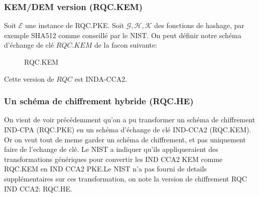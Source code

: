 \documentclass[12pt]{article}
\begin{document}
\subsubsection{KEM/DEM version (RQC.KEM)}
Soit $\mathcal{E}$ une instance de RQC.PKE. Soit $\mathcal{G}, \mathcal{H}, \mathcal{K}$ des fonctions de hashage, par exemple SHA512 comme conseillé par le NIST. On peut définir notre schéma d'échange de clé $RQC.KEM$ de la facon suivante:

\begin{figure}[h!]
    \centering
\noindent{}
    \caption{RQC.KEM}
    \label{fig:my_RQC.KEM}
\end{figure}

Cette version de $RQC $ est INDA-CCA2.

\subsubsection{Un schéma de chiffrement hybride (RQC.HE)}

On vient de voir précédemment qu'on a pu transformer un schéma de chiffrement IND-CPA (RQC.PKE) en un schéma d'échange de clé IND-CCA2 (RQC.KEM). Or on veut tout de meme garder un schéma de chiffrement, et pas uniquement faire de l'echange de clé. Le NIST a indiquer qu'ils appliqueraient des transformations génériques pour convertir les IND CCA2 KEM comme  RQC.KEM en IND CCA2 PKE.Le NIST n'a pas fourni de details supplémentaires sur ces transformation, on note la version de chiffrement RQC IND CCA2: RQC.HE.
\end{document}
